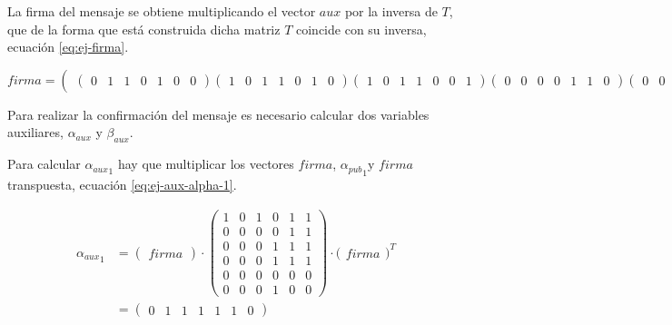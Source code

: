 La firma del mensaje se obtiene multiplicando el vector $aux$ por la inversa de $T$, que de la forma que está construida dicha matriz $T$ coincide con su inversa, ecuación \ref{eq:ej-firma}.

\begin{equation}\label{eq:ej-firma}
	{firma} = 
		\left(\begin{matrix}
			\left(\begin{smallmatrix}0 & 1 & 1 & 0 & 1 & 0 & 0\end{smallmatrix}\right)			
			\left(\begin{smallmatrix}1 & 0 & 1 & 1 & 0 & 1 & 0\end{smallmatrix}\right)
			\left(\begin{smallmatrix}1 & 0 & 1 & 1 & 0 & 0 & 1\end{smallmatrix}\right)
			\left(\begin{smallmatrix}0 & 0 & 0 & 0 & 1 & 1 & 0\end{smallmatrix}\right)			
			\left(\begin{smallmatrix}0 & 0 & 1 & 1 & 0 & 1 & 1\end{smallmatrix}\right)
			\left(\begin{smallmatrix}0 & 1 & 0 & 0 & 1 & 1 & 0\end{smallmatrix}\right)
		\end{matrix}\right)
\end{equation}

Para realizar la confirmación del mensaje es necesario calcular dos variables auxiliares, $\alpha_{aux}$ y $\beta_{aux}$.

Para calcular ${\alpha_{aux}}_1$ hay que multiplicar los vectores $firma$, ${\alpha_{pub}}_1$y $firma$ transpuesta, ecuación \ref{eq:ej-aux-alpha-1}.

\begin{equation}\label{eq:ej-aux-alpha-1}
	\begin{aligned}
	{{\alpha_{aux}}_1} & = 
		\begin{pmatrix}firma\end{pmatrix}
		\cdot \left(\begin{smallmatrix}
			1 & 0 & 1 & 0 & 1 & 1\\
			0 & 0 & 0 & 0 & 1 & 1\\
			0 & 0 & 0 & 1 & 1 & 1\\
			0 & 0 & 0 & 1 & 1 & 1\\
			0 & 0 & 0 & 0 & 0 & 0\\
			0 & 0 & 0 & 1 & 0 & 0
		\end{smallmatrix}\right)
		\cdot \big(\begin{matrix}firma\end{matrix}\big)^{\scriptscriptstyle T}\\
		& = \left(\begin{smallmatrix}0 & 1 & 1 & 1 & 1 & 1 & 0\end{smallmatrix}\right)
	\end{aligned}
\end{equation}

